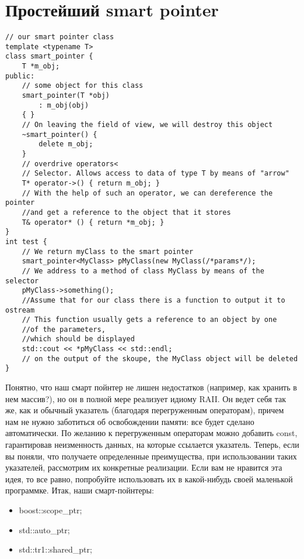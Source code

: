 ﻿\documentclass {article}
\begin{document}
\section{Простейший smart pointer}
\begin{lstlisting}[caption=Пример]
// our smart pointer class
template <typename T>
class smart_pointer {
    T *m_obj;
public:
    // some object for this class
    smart_pointer(T *obj)
        : m_obj(obj)
    { }
    // On leaving the field of view, we will destroy this object
    ~smart_pointer() {
        delete m_obj;
    }
    // overdrive operators<
    // Selector. Allows access to data of type T by means of "arrow"
    T* operator->() { return m_obj; }
    // With the help of such an operator, we can dereference the pointer
    //and get a reference to the object that it stores
    T& operator* () { return *m_obj; }
}
int test {
    // We return myClass to the smart pointer
    smart_pointer<MyClass> pMyClass(new MyClass(/*params*/);    
    // We address to a method of class MyClass by means of the selector
    pMyClass->something();  
    //Assume that for our class there is a function to output it to ostream
    // This function usually gets a reference to an object by one 
    //of the parameters,
    //which should be displayed
    std::cout << *pMyClass << std::endl;    
    // on the output of the skoupe, the MyClass object will be deleted
}
\end{lstlisting}
Понятно, что наш смарт пойнтер не лишен недостатков (например, как хранить в нем массив?), но он в полной мере реализует идиому RAII. Он ведет себя так же, как и обычный указатель (благодаря перегруженным операторам), причем нам не нужно заботиться об освобождении памяти: все будет сделано автоматически. По желанию к перегруженным операторам можно добавить const, гарантировав неизменность данных, на которые ссылается указатель.
Теперь, если вы поняли, что получаете определенные преимущества, при использовании таких указателей, рассмотрим их конкретные реализации. Если вам не нравится эта идея, то все равно, попробуйте использовать их в какой-нибудь своей маленькой программке.
Итак, наши смарт-пойнтеры:
\begin{itemize}
\item boost::scope\_ptr;
\item std::auto\_ptr;
\item std::tr1::shared\_ptr;
\end{itemize}
\end{document}
